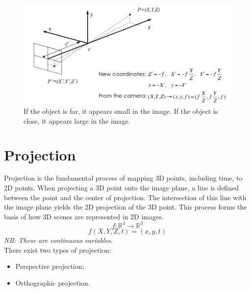 \begin{figure}[H]
    \centering
    \includegraphics[width=1\textwidth]{Figures/Pinhole.png}
    \caption{If the object is far, it appears small in the image. If the object is close, it appears large in the image.}
\end{figure}
\section{Projection}
Projection is the fundamental process of mapping 3D points, including time, to 2D points. When projecting a 3D point onto the image plane, a line is defined between the point and the center of projection. The intersection of this line with the image plane yields the 2D projection of the 3D point. This process forms the basis of how 3D scenes are represented in 2D images.
\[
    f: \mathbb{R}^4 \rightarrow \mathbb{R}^3    
\]
\[
    f(X,Y,Z,t) = (x,y,t)
\]
\textit{NB: These are continuous variables.}       
\\
There exist two types of projection:
\begin{itemize}
    \item Perspective projection;
    \item Orthographic projection.
\end{itemize}

